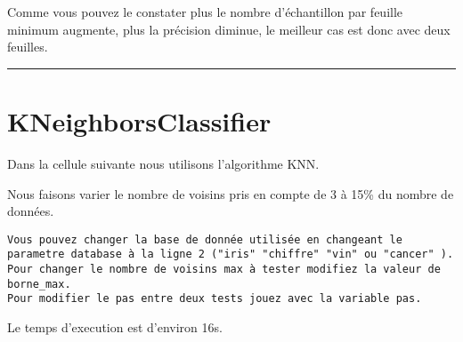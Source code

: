 \documentclass[11pt]{article}
\begin{document}
    Comme vous pouvez le constater plus le nombre d'échantillon par feuille
minimum augmente, plus la précision diminue, le meilleur cas est donc
avec deux feuilles.

\begin{center}\rule{0.5\linewidth}{\linethickness}\end{center}

    \section{KNeighborsClassifier}\label{kneighborsclassifier}

Dans la cellule suivante nous utilisons l'algorithme KNN.

Nous faisons varier le nombre de voisins pris en compte de 3 à 15\% du
nombre de données.

\begin{verbatim}
Vous pouvez changer la base de donnée utilisée en changeant le parametre database à la ligne 2 ("iris" "chiffre" "vin" ou "cancer" ).
Pour changer le nombre de voisins max à tester modifiez la valeur de borne_max.
Pour modifier le pas entre deux tests jouez avec la variable pas.
\end{verbatim}

Le temps d'execution est d'environ 16s.
\end{document}

